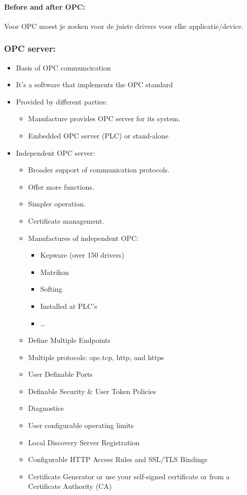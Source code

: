 \documentclass[12pt]{article}
\begin{document}
\paragraph{Before and after OPC:}
Voor OPC moest je zoeken voor de juiste drivers voor elke applicatie/device.
\subsubsection{OPC server:}
\begin{itemize}
    \item Basis of OPC communcication
    \item It's a software that implements the OPC standard
    \item Provided by different parties:\begin{itemize}
        \item Manufacture provides OPC server for its system.
        \item Embedded OPC server (PLC) or stand-alone
    \end{itemize}
    \item Independent OPC server:\begin{itemize}
        \item Broader support of communication protocols.
        \item Offer more functions.
        \item Simpler operation.
        \item Certificate management.
        \item Manufactures of independent OPC:\begin{itemize}
            \item Kepware (over 150 drivers)
            \item Matrikon 
            \item Softing 
            \item Installed at PLC's
            \item \dots
        \end{itemize}
        \item Define Multiple Endpoints
        \item Multiple protocols: opc.tcp, http, and https
        \item User Definable Ports
        \item Definable Security \& User Token Policies
        \item Diagnostics
        \item User configurable operating limits
        \item Local Discovery Server Registration
        \item Configurable HTTP Access Rules and SSL/TLS
        Bindings
        \item Certificate Generator or use your self-signed
        certificate or from a Certificate Authority (CA)
    \end{itemize}
\end{itemize}
\end{document}
